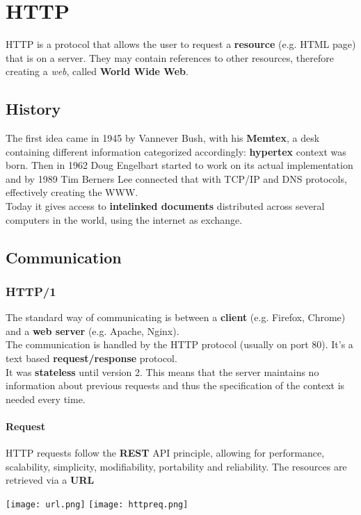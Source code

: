 \newpage
\section{HTTP}
HTTP is a protocol that allows the user to request a \textbf{resource} (e.g. HTML page) that is on a server. They may contain references to other resources, therefore creating a \textit{web}, called \textbf{World Wide Web}.
\subsection{History}
The first idea came in 1945 by Vannever Bush, with his \textbf{Memtex}, a desk containing different information categorized accordingly: \textbf{hypertex} context was born. Then in 1962 Doug Engelbart started to work on its actual implementation and by 1989 Tim Berners Lee connected that with TCP/IP and DNS protocols, effectively creating the WWW. \\
Today it gives access to \textbf{intelinked documents} distributed across several computers in the world, using the internet as exchange.

\subsection{Communication}
\subsubsection{HTTP/1}
The standard way of communicating is between a \textbf{client} (e.g. Firefox, Chrome) and a \textbf{web server} (e.g. Apache, Nginx).\\
The communication is handled by the HTTP protocol (usually on port $80$). It's a text based \textbf{request/response} protocol.\\
It was \textbf{stateless} until version 2. This means that the server maintains no information about previous requests and thus the specification of the context is needed every time.\\

\paragraph{Request} HTTP requests follow the \textbf{REST} API principle, allowing for performance, scalability, simplicity, modifiability, portability and reliability. The resources are retrieved via a \textbf{URL}

\begin{center}
	\texttt{[image: url.png]}
	\texttt{[image: httpreq.png]}
\end{center}

